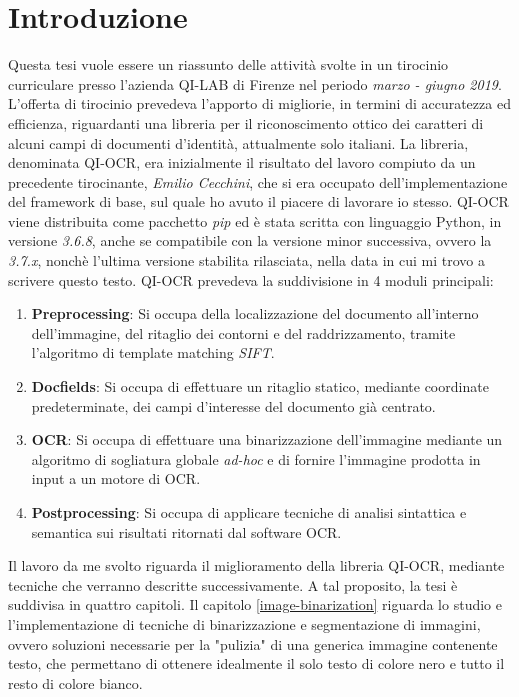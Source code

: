 \chapter*{Introduzione}

Questa tesi vuole essere un riassunto delle attivit\`a svolte in un tirocinio curriculare presso l'azienda QI-LAB di Firenze nel periodo \textit{marzo - giugno 2019}. L'offerta di tirocinio prevedeva l'apporto di migliorie, in termini di accuratezza ed efficienza, riguardanti una libreria per il riconoscimento ottico dei caratteri di alcuni campi di documenti d'identit\`a, attualmente solo italiani. La libreria, denominata QI-OCR, era inizialmente il risultato del lavoro compiuto da un precedente tirocinante, \textit{Emilio Cecchini}, che si era occupato dell'implementazione del framework di base, sul quale ho avuto il piacere di lavorare io stesso. QI-OCR viene distribuita come pacchetto \textit{pip} ed \`e stata scritta con linguaggio Python, in versione \textit{3.6.8}, anche se compatibile con la versione minor successiva, ovvero la \textit{3.7.x}, nonch\`e l'ultima versione stabilita rilasciata, nella data in cui mi trovo a scrivere questo testo. QI-OCR prevedeva la suddivisione in 4 moduli principali:
\begin{enumerate}
	\item \textbf{Preprocessing}: Si occupa della localizzazione del documento all'interno dell'immagine, del ritaglio dei contorni e del raddrizzamento, tramite l'algoritmo di template matching \textit{SIFT}.
	\item \textbf{Docfields}: Si occupa di effettuare un ritaglio statico, mediante coordinate predeterminate, dei campi d'interesse del documento gi\`a centrato.
	\item \textbf{OCR}: Si occupa di effettuare una binarizzazione dell'immagine mediante un algoritmo di sogliatura globale \textit{ad-hoc} e di fornire l'immagine prodotta in input a un motore di OCR.
	\item \textbf{Postprocessing}: Si occupa di applicare tecniche di analisi sintattica e semantica sui risultati ritornati dal software OCR.
\end{enumerate}
Il lavoro da me svolto riguarda il miglioramento della libreria QI-OCR, mediante tecniche che verranno descritte successivamente. A tal proposito, la tesi \`e suddivisa in quattro capitoli. Il capitolo \ref{image-binarization} riguarda lo studio e l'implementazione di tecniche di binarizzazione e segmentazione di immagini, ovvero soluzioni necessarie per la "pulizia" di una generica immagine contenente testo, che permettano di ottenere idealmente il solo testo di colore nero e tutto il resto di colore bianco.
